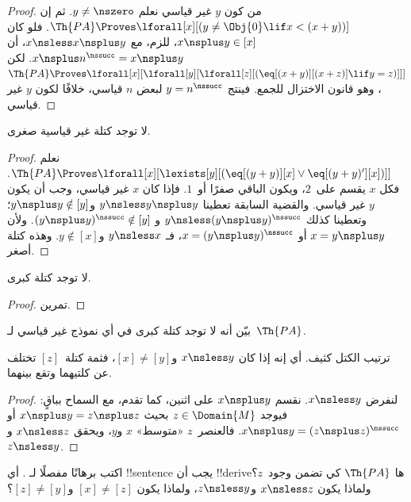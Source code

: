 \documentclass[../../../include/open-logic-section]{subfiles}
\begin{document}
\begin{proof}
من كون $y$ غير قياسي نعلم $y \neq \nszero$. ثم إن
$\Th{PA} \Proves \lforall[x][(y \neq \Obj{0} \lif x < (x+y))]$.
فلو كان $x \nsplus y \in [x]$، للزم، مع
$x \nsless x \nsplus y$، أن
$x \nsplus n^\nssucc = x \nsplus y$.
لكن $\Th{PA} \Proves \lforall[x][\lforall[y][\lforall[z][(\eq[(x+y)][(x+z)] \lif y = z)]]]$،
وهو قانون الاختزال للجمع. فينتج $y = n^\nssucc$
لبعض $n$ قياسي، خلافًا لكون $y$ غير قياسي.
\end{proof}

\begin{prop}
لا توجد كتلة غير قياسية صغرى.
\end{prop}

\begin{proof}
نعلم $\Th{PA} \Proves \lforall[x][\lexists[y][(\eq[(y+y)][x] \lor
      \eq[(y+y)'][x])]]$. فكل $x$ يقسم على~$2$،
ويكون الباقي صفرًا أو~$1$. فإذا كان $x$ غير قياسي،
وجب أن يكون $y$ غير قياسي. والقضية السابقة تعطينا
$y \nsless y \nsplus y$ و$y \nsplus y \notin [y]$؛
وتعطينا كذلك $y \nsless (y \nsplus y)^\nssucc$ و
$(y \nsplus y)^\nssucc \notin [y]$.
ولأن $x = y \nsplus y$ أو $x = (y \nsplus y)^\nssucc$،
فـ $y \nsless x$ و$y \notin [x]$. وهذه كتلة أصغر.
\end{proof}

\begin{prop}
لا توجد كتلة كبرى.
\end{prop}

\begin{proof}
تمرين.
\end{proof}

\begin{prob}
بيّن أنه لا توجد كتلة كبرى في أي نموذج غير قياسي لـ~$\Th{PA}$.
\end{prob}

\begin{prop}
ترتيب الكتل كثيف. أي إنه إذا كان $x \nsless y$ و$[x] \neq [y]$،
فثمة كتلة~$[z]$ تختلف عن كلتيهما وتقع بينهما.
\end{prop}

\begin{proof}
لنفرض $x \nsless y$. نقسم $x \nsplus y$ على اثنين،
كما تقدم، مع السماح بباقٍ: فيوجد $z \in \Domain{M}$
بحيث $x \nsplus y = z \nsplus z$ أو
$x \nsplus y = (z \nsplus z)^\nssucc$.
فالعنصر~$z$ «متوسط» $x$ و$y$، ويحقق
$x \nsless z$ و$z \nsless y$.
\end{proof}

\begin{prob}
اكتب برهانًا مفصلًا لـ
. أي !!{sentence} يجب أن
!!{derive}ها $\Th{PA}$ كي تضمن وجود~$z$؟ ولماذا يكون $x \nsless z$
و$z \nsless y$، ولماذا يكون $[x] \neq [z]$ و$[z] \neq [y]$؟
\end{prob}
\end{document}
